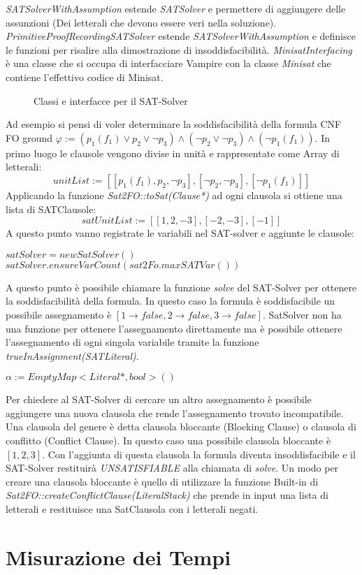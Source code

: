 \documentclass[./main.tex]{subfiles}
\begin{document}
\textit{SATSolverWithAssumption} estende \textit{SATSolver} e permettere di aggiungere delle assunzioni (Dei letterali che devono essere veri nella soluzione).
\textit{PrimitiveProofRecordingSATSolver} estende \textit{SATSolverWithAssumption} e definisce le funzioni per risalire alla dimostrazione di insoddisfacibilità.
\textit{MinisatInterfacing} è una classe che si occupa di interfacciare Vampire con la classe \textit{Minisat} che contiene
l'effettivo codice di Minisat.

\begin{figure}[h]
    \centering
    \scalebox{0.5}{
        
    }
    \caption{Classi e interfacce per il SAT-Solver}
    \label{fig:vampire_sat_solver}
\end{figure}

Ad esempio si pensi di voler determinare la soddisfacibilità della formula CNF FO ground 
$\varphi := (p_1(f_1) \lor p_2 \lor \lnot p_3) \land (\lnot p_2 \lor \lnot p_3) \land (\lnot p_1(f_1))$.
In primo luogo le clausole vengono divise in unità e rappresentate come Array di letterali:
$$unitList := [[p_1(f_1), p_2, \lnot p_3], [\lnot p_2, \lnot p_3], [\lnot p_1(f_1)]]$$
Applicando la funzione \textit{Sat2FO::toSat(Clause*)} ad ogni clausola si ottiene una lista di SATClausole:
$$satUnitList := [[1, 2, -3], [-2, -3], [-1]]$$
A questo punto vanno registrate le variabili nel SAT-solver e aggiunte le clausole:

$satSolver = new SatSolver()$ \\
$satSolver.ensureVarCount(sat2Fo.maxSATVar())$ \\

A questo punto è possibile chiamare la funzione \textit{solve} del SAT-Solver per ottenere la soddisfacibilità della formula.
In questo caso la formula è soddisfacibile un possibile assegnamento è $[1 \rightarrow false, 2 \rightarrow false, 3 \rightarrow false]$.
SatSolver non ha una funzione per ottenere l'assegnamento direttamente ma è possibile ottenere l'assegnamento di ogni singola variabile
tramite la funzione \textit{trueInAssignment(SATLiteral)}.

$\alpha := EmptyMap<Literal*, bool>()$ \\


Per chiedere al SAT-Solver di cercare un altro assegnamento è possibile aggiungere una nuova clausola 
che rende l'assegnamento trovato incompatibile. Una clausola del genere è detta clausola bloccante (Blocking Clause) o clausola di conflitto (Conflict Clause).
In questo caso una possibile clausola bloccante è $[1,2,3]$. 
Con l'aggiunta di questa clausola la formula diventa insoddisfacibile e il SAT-Solver restituirà \textit{UNSATISFIABLE} alla chiamata di \textit{solve}.
Un modo per creare una clausola bloccante è quello di utilizzare la funzione Built-in di \textit{Sat2FO::createConflictClause(LiteralStack)}
che prende in input una lista di letterali e restituisce una SatClausola con i letterali negati.

\section{Misurazione dei Tempi} \label{sec:vampire_time}
  
\end{document}
